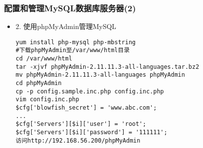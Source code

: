 \documentclass[xcolor=svgnames,presentation]{beamer}
\begin{document}
\begin{frame}[fragile]
\frametitle{配置和管理MySQL数据库服务器(2)}
\label{sec-2-3}
\begin{itemize}

\item 2. 使用phpMyAdmin管理MySQL\\
\label{sec-2-3-1}%
\begin{verbatim}
yum install php-mysql php-mbstring
#下载phpMyAdmin至/var/www/html目录
cd /var/www/html
tar -xjvf phpMyAdmin-2.11.11.3-all-languages.tar.bz2
mv phpMyAdmin-2.11.11.3-all-languages phpMyAdmin
cd phpMyAdmin
cp -p config.sample.inc.php config.inc.php
vim config.inc.php
$cfg['blowfish_secret'] = 'www.abc.com';
...
$cfg['Servers'][$i]['user'] = 'root';
$cfg['Servers'][$i]['password'] = '111111';
访问http://192.168.56.200/phpMyAdmin
\end{verbatim}
\end{itemize} %
\end{frame}
\end{document}
